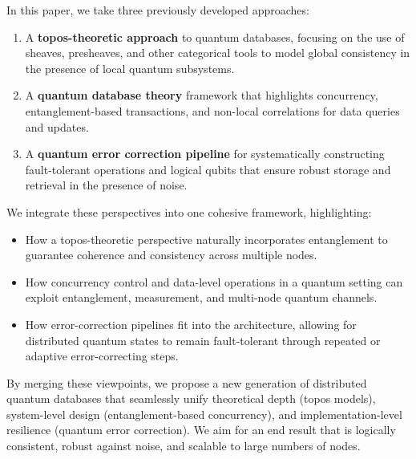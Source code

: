 \documentclass[11pt]{article}
\begin{document}
In this paper, we take three previously developed approaches:
\begin{enumerate}
    \item A \textbf{topos-theoretic approach} to quantum databases, focusing on the use of sheaves, presheaves, and other categorical tools to model global consistency in the presence of local quantum subsystems.
    \item A \textbf{quantum database theory} framework that highlights concurrency, entanglement-based transactions, and non-local correlations for data queries and updates.
    \item A \textbf{quantum error correction pipeline} for systematically constructing fault-tolerant operations and logical qubits that ensure robust storage and retrieval in the presence of noise.
\end{enumerate}
We integrate these perspectives into one cohesive framework, highlighting:
\begin{itemize}
    \item How a topos-theoretic perspective naturally incorporates entanglement to guarantee coherence and consistency across multiple nodes.
    \item How concurrency control and data-level operations in a quantum setting can exploit entanglement, measurement, and multi-node quantum channels.
    \item How error-correction pipelines fit into the architecture, allowing for distributed quantum states to remain fault-tolerant through repeated or adaptive error-correcting steps.
\end{itemize}

By merging these viewpoints, we propose a new generation of distributed quantum databases that seamlessly unify theoretical depth (topos models), system-level design (entanglement-based concurrency), and implementation-level resilience (quantum error correction). We aim for an end result that is logically consistent, robust against noise, and scalable to large numbers of nodes.
\end{document}
